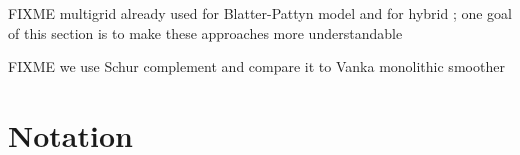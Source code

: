 \documentclass[letterpaper,final,12pt,reqno]{amsart}
\numberwithin{equation}{section}
\numberwithin{figure}{section}
\numberwithin{table}{section}
\begin{document}
FIXME multigrid already used for Blatter-Pattyn model \cite{BrownSmithAhmadia2013} and for hybrid \cite{Jouvetetal2013}; one goal of this section is to make these approaches more understandable

FIXME we use Schur complement \cite{Bueler2021,Elmanetal2014} and compare it to Vanka monolithic smoother \cite{Farrelletal2019}

\small

\bigskip



\normalsize

\appendix
\section{Notation}

\renewcommand{\arraystretch}{1.2}
\end{document}
